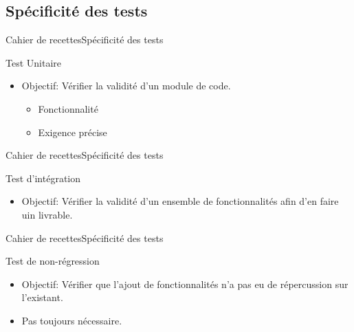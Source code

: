    \subsection{Spécificité des tests}
      \begin{frame}{Cahier de recettes}{Spécificité des tests}
        \begin{block}{Test Unitaire}
          \begin{itemize}
            \item<1-> Objectif: Vérifier la validité d'un module de code.
            \begin{itemize}
              \item<2-> Fonctionnalité
              \item<3-> Exigence précise
            \end{itemize}
          \end{itemize}
        \end{block}
      \end{frame}
      \begin{frame}{Cahier de recettes}{Spécificité des tests}
        \begin{block}{Test d'intégration}
          \begin{itemize}
            \item<1-> Objectif: Vérifier la validité d'un ensemble de fonctionnalités afin d'en faire uin livrable.
          \end{itemize}
        \end{block}
      \end{frame}
      \begin{frame}{Cahier de recettes}{Spécificité des tests}
        \begin{block}{Test de non-régression}
          \begin{itemize}
            \item<1-> Objectif: Vérifier que l'ajout de fonctionnalités n'a pas eu de répercussion sur l'existant.
            \item<2-> Pas toujours nécessaire.
          \end{itemize}
        \end{block}
      \end{frame}

